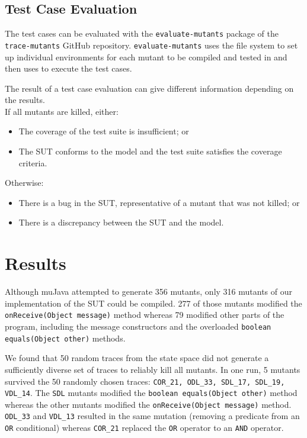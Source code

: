 \documentclass{article}
\begin{document}
		\subsection{Test Case Evaluation}
			\label{sec:method_testing}
			The test cases can be evaluated with the \texttt{evaluate-mutants} package of the \texttt{trace-mutants} GitHub repository. \texttt{evaluate-mutants} uses the file system to set up individual environments for each mutant to be compiled and tested in and then uses \citeauthor{sbt} to execute the test cases.

			The result of a test case evaluation can give different information depending on the results. \\
			If all mutants are killed, either:
				\begin{itemize}
					\item The coverage of the test suite is insufficient; or
					\item The SUT conforms to the model and the test suite satisfies the coverage criteria.
				\end{itemize}
			Otherwise:
				\begin{itemize}
					\item There is a bug in the SUT, representative of a mutant that was not killed; or
					\item There is a discrepancy between the SUT and the model.
				\end{itemize}

	\section{Results}
		Although muJava attempted to generate 356 mutants, only 316 mutants of our implementation of the SUT could be compiled. 277 of those mutants modified the \texttt{onReceive(Object message)} method whereas 79 modified other parts of the program, including the message constructors and the overloaded \texttt{boolean equals(Object other)} methods.

		We found that 50 random traces from the state space did not generate a sufficiently diverse set of traces to reliably kill all mutants.
		In one run, 5 mutants survived the 50 randomly chosen traces: \texttt{COR\_21, ODL\_33, SDL\_17, SDL\_19, VDL\_14}. The \texttt{SDL} mutants modified the \texttt{boolean equals(Object other)} method whereas the other mutants modified the \texttt{onReceive(Object message)} method. \texttt{ODL\_33} and \texttt{VDL\_13} resulted in the same mutation (removing a predicate from an \texttt{OR} conditional) whereas \texttt{COR\_21} replaced the \texttt{OR} operator to an \texttt{AND} operator.
\end{document}
